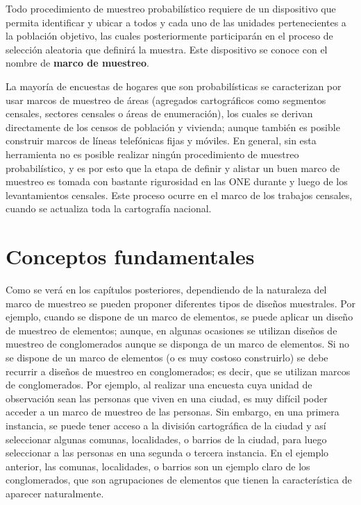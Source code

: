 \documentclass[
  12pt,
]{book}
\begin{document}
Todo procedimiento de muestreo probabilístico requiere de un dispositivo que permita identificar y ubicar a todos y cada uno de las unidades pertenecientes a la población objetivo, las cuales posteriormente participarán en el proceso de selección aleatoria que definirá la muestra. Este dispositivo se conoce con el nombre de \textbf{marco de muestreo}.

La mayoría de encuestas de hogares que son probabilísticas se caracterizan por usar marcos de muestreo de áreas (agregados cartográficos como segmentos censales, sectores censales o áreas de enumeración), los cuales se derivan directamente de los censos de población y vivienda; aunque también es posible construir marcos de líneas telefónicas fijas y móviles. En general, sin esta herramienta no es posible realizar ningún procedimiento de muestreo probabilístico, y es por esto que la etapa de definir y alistar un buen marco de muestreo es tomada con bastante rigurosidad en las ONE durante y luego de los levantamientos censales. Este proceso ocurre en el marco de los trabajos censales, cuando se actualiza toda la cartografía nacional.

\hypertarget{conceptos-fundamentales}{%
\section{Conceptos fundamentales}\label{conceptos-fundamentales}}

Como se verá en los capítulos posteriores, dependiendo de la naturaleza del marco de muestreo se pueden proponer diferentes tipos de diseños muestrales. Por ejemplo, cuando se dispone de un marco de elementos, se puede aplicar un diseño de muestreo de elementos; aunque, en algunas ocasiones se utilizan diseños de muestreo de conglomerados aunque se disponga de un marco de elementos. Si no se dispone de un marco de elementos (o es muy costoso construirlo) se debe recurrir a diseños de muestreo en conglomerados; es decir, que se utilizan marcos de conglomerados. Por ejemplo, al realizar una encuesta cuya unidad de observación sean las personas que viven en una ciudad, es muy difícil poder acceder a un marco de muestreo de las personas. Sin embargo, en una primera instancia, se puede tener acceso a la división cartográfica de la ciudad y así seleccionar algunas comunas, localidades, o barrios de la ciudad, para luego seleccionar a las personas en una segunda o tercera instancia. En el ejemplo anterior, las comunas, localidades, o barrios son un ejemplo claro de los conglomerados, que son agrupaciones de elementos que tienen la característica de aparecer naturalmente.
\end{document}
